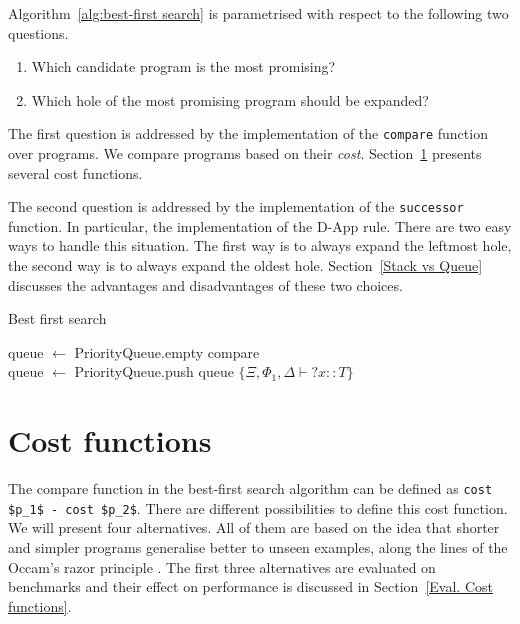 Algorithm~\ref{alg:best-first search} is parametrised with respect to the following two questions.
\begin{enumerate}
\item Which candidate program is the most promising?
\item Which hole of the most promising program should be expanded?
\end{enumerate}
The first question is addressed by the implementation of the \lstinline?compare? function over programs. We compare programs based on their \emph{cost}. Section~\ref{Cost functions} presents several cost functions.

The second question is addressed by the implementation of the \lstinline?successor? function. In particular, the implementation of the D-App rule. There are two easy ways to handle this situation. The first way is to always expand the leftmost hole, the second way is to always expand the oldest hole. Section~\ref{Stack vs Queue} discusses the advantages and disadvantages of these two choices.

\begin{algorithm}
\caption{Best first search\label{alg:best-first search}}

queue $\gets$ PriorityQueue.empty {\color{blue}compare}\\
queue $\gets$ PriorityQueue.push queue $\{\Xi, \Phi_1, \Delta \vdash {?x} :: T\}$\\

\end{algorithm}

\section{Cost functions}\label{Cost functions}
The compare function in the best-first search algorithm can be defined as \lstinline?cost $p_1$ - cost $p_2$?. There are different possibilities to define this cost function. We will present four alternatives. All of them are based on the idea that shorter and simpler programs generalise better to unseen examples, along the lines of the Occam's razor principle \cite{computationalLearningTheory}. The first three alternatives are evaluated on benchmarks and their effect on performance is discussed in Section~\ref{Eval. Cost functions}.

